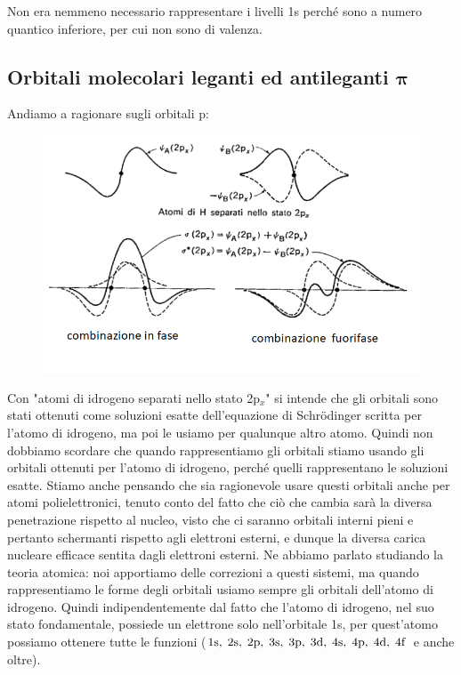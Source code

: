 \vspace{0.2cm}Non era nemmeno necessario rappresentare i livelli 1s perché sono a numero quantico inferiore, per cui non sono di valenza.
\newpage
\subsection{Orbitali molecolari leganti ed antileganti $\boldsymbol{\pi}$}
Andiamo a ragionare sugli orbitali p:

\begin{figure}[htp]
    \centering
    \includegraphics[width=14cm]{immagini/orbitali_molecolari_pigreco.png}
\end{figure}

\vspace{-1cm}Con "atomi di idrogeno separati nello stato 2p$_x$" si intende che gli orbitali sono stati ottenuti come soluzioni esatte dell'equazione di Schrödinger scritta per l'atomo di idrogeno, ma poi le usiamo per qualunque altro atomo. Quindi non dobbiamo scordare che quando rappresentiamo gli orbitali stiamo usando gli orbitali ottenuti per l'atomo di idrogeno, perché quelli rappresentano le soluzioni esatte. Stiamo anche pensando che sia ragionevole usare questi orbitali anche per atomi polielettronici, tenuto conto del fatto che ciò che cambia sarà la diversa penetrazione rispetto al nucleo, visto che ci saranno orbitali interni pieni e pertanto schermanti rispetto agli elettroni esterni, e dunque la diversa carica nucleare efficace sentita dagli elettroni esterni. Ne abbiamo parlato studiando la teoria atomica: noi apportiamo delle correzioni a questi sistemi, ma quando rappresentiamo le forme degli orbitali usiamo sempre gli orbitali dell'atomo di idrogeno. Quindi indipendentemente dal fatto che l'atomo di idrogeno, nel suo stato fondamentale, possiede un elettrone solo nell'orbitale 1s, per quest'atomo possiamo ottenere tutte le funzioni ($ \rm 1s, \; 2s, \; 2p, \; 3s, \; 3p, \; 3d, \; 4s, \; 4p, \; 4d, \; 4f$ e anche oltre).

